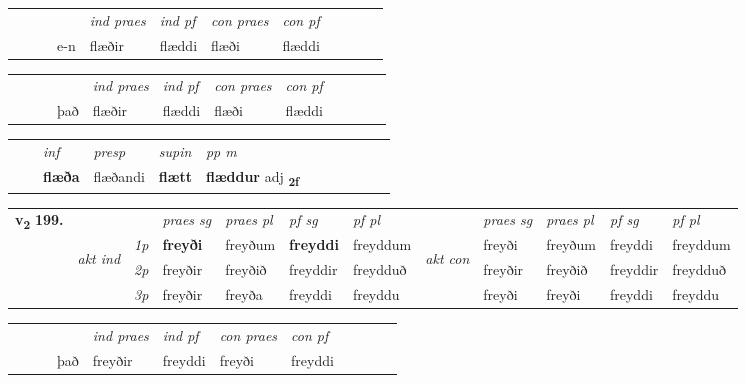 \begin{tabular}{llllllllllll}
 & &  & &  \textit{ind praes} & \textit{ind pf} & \textit{con praes} & \textit{con pf} \\*
&  & & e-n & flæðir & flæddi & flæði & flæddi \\*
\cmidrule{5-9}
\end{tabular}


\begin{tabular}{llllllllllll}
 & &  & &  \textit{ind praes} & \textit{ind pf} & \textit{con praes} & \textit{con pf} \\*
&  & & það & flæðir & flæddi & flæði & flæddi \\*
\cmidrule{5-9}
\end{tabular}


\begin{tabular}{llllllllllll}
 & & \textit{inf}     & \textit{presp} & \textit{supin}  & \textit{pp m}     \\*
  & & \textbf{flæða}      & flæðandi &  \textbf{flætt}  & \textbf{flæddur} adj \textbf{\textsubscript{2f}} \\*
\cmidrule{1-12}
\end{tabular}



\begin{tabular}{llllllllllll} \toprule
\multirow{4}{*}{{{\textbf{v{\textsubscript{2}}} \Large{\textbf{199.}}}}}  & &   &  \textit{praes sg}  & \textit{praes pl}  &\textit{ pf sg} & \textit{pf pl} &  &  \textit{praes sg}  & \textit{praes pl}  & \textit{pf sg} & \textit{pf pl } \\*
	\cmidrule{4-7} \cmidrule{9-12}
 & \multirow{3}{*}{\begin{turn}{90}\textit{akt ind}\end{turn}} & {\textit{1p}} & \textbf{freyði} & freyðum    & \textbf{freyddi} & freyddum & \multirow{3}{*}{\begin{turn}{90}\textit{akt con}\end{turn}} &freyði & freyðum & freyddi & freyddum\\*
& &  {\textit{2p}} &  freyðir  & freyðið   & freyddir & freydduð & & freyðir & freyðið & freyddir & freydduð \\*
& &  {\textit{3p}} & freyðir & freyða   & freyddi & freyddu & & freyði & freyði& freyddi & freyddu  \\*
\cmidrule{4-7} \cmidrule{9-12}
\end{tabular}


\begin{tabular}{llllllllllll}
 & &  & &  \textit{ind praes} & \textit{ind pf} & \textit{con praes} & \textit{con pf} \\*
&  & & það & freyðir & freyddi & freyði & freyddi \\*
\cmidrule{5-9}
\end{tabular}


